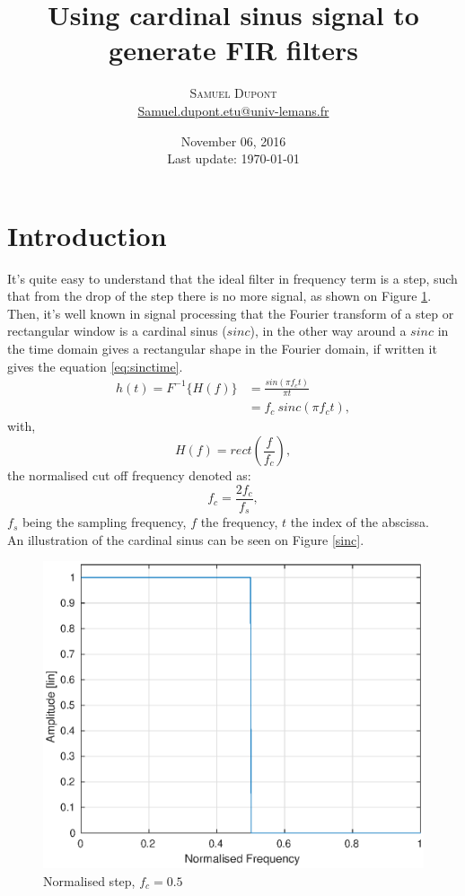 \documentclass[twoside,twocolumn]{article}
\title{Using cardinal sinus signal to generate FIR filters } %
\author{%
\textsc{Samuel Dupont}\\ %
\normalsize \href{mailto:Samuel.dupont.etu@univ-lemans.fr}{Samuel.dupont.etu@univ-lemans.fr } 
}
\date{November 06, 2016 \\ Last update: \today}
\begin{document}
\maketitle


\section{Introduction}
It's quite easy to understand that the ideal filter in frequency term is a step, such that from the drop of the step there is no more signal, as shown on Figure \ref{step}.\\
Then, it's well known in signal processing that the Fourier transform of a step or rectangular window is a cardinal sinus ($sinc$), in the other way around a $sinc$ in the time domain gives a rectangular shape in the Fourier domain, if written it gives the equation \ref{eq:sinctime}. 
\begin{equation}
	\begin{split}
		h(t)=F^{-1}\lbrace H(f) \rbrace & =  \frac{sin(\pi f_c t)}{\pi t}\\
										& =  f_c\  sinc(\pi f_ct),
	\end{split}
\label{eq:sinctime}
\end{equation} 
with,
\begin{equation}
H(f)=rect(\frac{f}{f_c}),
\label{eq:rect}
\end{equation} 
the normalised cut off frequency denoted as:
\begin{equation}
f_c=\frac{2f_c}{f_s},
\end{equation} 
$f_s$ being the sampling frequency, $f$ the frequency, $t$ the index of the abscissa.\\
An illustration of the cardinal sinus can be seen on Figure \ref{sinc}. 
\begin{figure}[h!]
	\centering
	\includegraphics[scale=0.45]{./images/step.eps}
	\caption{Normalised step, $f_c=0.5$}
	\label{step}
\end{figure}
\end{document}
